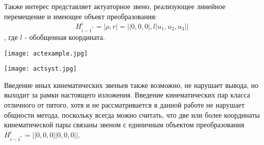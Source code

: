 Также интерес представляет актуаторное звено, реализующее линейное перемещение и имеющее объект преобразования:
\begin{equation}
H^i_{{i-1}^*} = |\rho, r| = ||0, 0, 0|, l|u_1, u_2, u_3||
\end{equation}, где $l$ - обобщенная координата.

\begin{center}
  \texttt{[image: actexample.jpg]}
  \label{}
\end{center}

\begin{center}
  \texttt{[image: actsyst.jpg]}
  \label{}
\end{center}

Введение иных кинематических звеньев также возможно, не нарушает вывода, но выходит за рамки настоящего изложения. Введение кинематических пар класса отличного от пятого, хотя и не рассматривается в данной работе не нарушает общности метода, поскольку всегда можно считать, что две или более координаты кинематической пары связаны звеном с единичным объектом преобразования $H^i_{{i-1}^*} = ||0, 0, 0| |0, 0, 0||$.